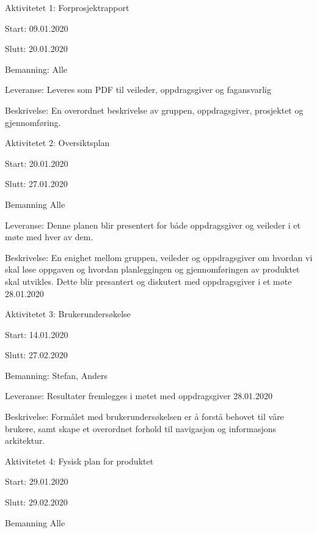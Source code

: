 \documentclass[11pt,a4paper]{report}
\begin{document}
\begin{compactdesc}
\item [Aktivitetet 1:] Forprosjektrapport
	\begin{compactitem}
	\item Start: 09.01.2020
	\item Slutt: 20.01.2020
	\item Bemanning: Alle
	\item Leveranse: Leveres som PDF til veileder, oppdragsgiver og fagansvarlig
	\item Beskrivelse: En overordnet beskrivelse av gruppen, oppdragsgiver, prosjektet og gjennomføring.
	\end{compactitem}
	\item [Aktivitetet 2:] Oversiktsplan
	\begin{compactitem}
	\item Start: 20.01.2020
	\item Slutt: 27.01.2020
	\item Bemanning Alle
	\item Leveranse: Denne planen blir presentert for både oppdragsgiver og veileder i et møte med hver av dem.
	\item Beskrivelse: En enighet mellom gruppen, veileder og oppdragsgiver om hvordan vi skal løse oppgaven og hvordan planleggingen og gjennomføringen av produktet skal utvikles. Dette blir presantert og diskutert med oppdragsgiver i et møte 28.01.2020
	\end{compactitem} 
	\item [Aktivitetet 3:] Brukerundersøkelse
	\begin{compactitem}
	\item Start: 14.01.2020
	\item Slutt: 27.02.2020
	\item Bemanning: Stefan, Anders
	\item Leveranse: Resultater fremlegges i møtet med oppdragsgiver 28.01.2020
	\item Beskrivelse: Formålet med brukerundersøkelsen er å forstå behovet til våre brukere, samt skape et overordnet forhold til navigasjon og informasjons arkitektur. 
	\end{compactitem}
	\item [Aktivitetet 4:] Fysisk plan for produktet
	\begin{compactitem}
	\item Start: 29.01.2020
	\item Slutt: 29.02.2020
	\item Bemanning Alle

\end{compactitem}
\end{compactdesc}
\end{document}
